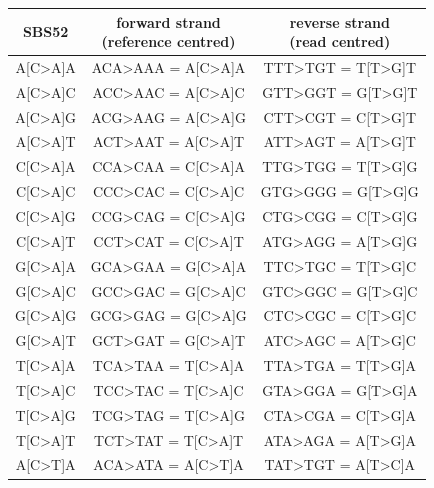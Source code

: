 \begingroup
\setlength{\LTleft}{-20cm plus -1fill} %
\setlength{\LTright}{\LTleft}
\begin{longtable}{c|c|c}
\label{tab:SBS96-to-SBS52} \\ \smallskip
SBS52 & \makecell{forward strand \\ (reference centred)} & \makecell{reverse strand \\ (read centred)}  \\ \hline
\ttfamily A[C>A]A & \ttfamily ACA>AAA = A[C>A]A & \ttfamily TTT>TGT = T[T>G]T \\ \hline
\ttfamily A[C>A]C & \ttfamily ACC>AAC = A[C>A]C & \ttfamily GTT>GGT = G[T>G]T \\ \hline
\ttfamily A[C>A]G & \ttfamily ACG>AAG = A[C>A]G & \ttfamily CTT>CGT = C[T>G]T \\ \hline
\ttfamily A[C>A]T & \ttfamily ACT>AAT = A[C>A]T & \ttfamily ATT>AGT = A[T>G]T \\ \hline
\ttfamily C[C>A]A & \ttfamily CCA>CAA = C[C>A]A & \ttfamily TTG>TGG = T[T>G]G \\ \hline
\ttfamily C[C>A]C & \ttfamily CCC>CAC = C[C>A]C & \ttfamily GTG>GGG = G[T>G]G \\ \hline
\ttfamily C[C>A]G & \ttfamily CCG>CAG = C[C>A]G & \ttfamily CTG>CGG = C[T>G]G \\ \hline
\ttfamily C[C>A]T & \ttfamily CCT>CAT = C[C>A]T & \ttfamily ATG>AGG = A[T>G]G \\ \hline
\ttfamily G[C>A]A & \ttfamily GCA>GAA = G[C>A]A & \ttfamily TTC>TGC = T[T>G]C \\ \hline
\ttfamily G[C>A]C & \ttfamily GCC>GAC = G[C>A]C & \ttfamily GTC>GGC = G[T>G]C \\ \hline
\ttfamily G[C>A]G & \ttfamily GCG>GAG = G[C>A]G & \ttfamily CTC>CGC = C[T>G]C \\ \hline
\ttfamily G[C>A]T & \ttfamily GCT>GAT = G[C>A]T & \ttfamily ATC>AGC = A[T>G]C \\ \hline
\ttfamily T[C>A]A & \ttfamily TCA>TAA = T[C>A]A & \ttfamily TTA>TGA = T[T>G]A \\ \hline
\ttfamily T[C>A]C & \ttfamily TCC>TAC = T[C>A]C & \ttfamily GTA>GGA = G[T>G]A \\ \hline
\ttfamily T[C>A]G & \ttfamily TCG>TAG = T[C>A]G & \ttfamily CTA>CGA = C[T>G]A \\ \hline
\ttfamily T[C>A]T & \ttfamily TCT>TAT = T[C>A]T & \ttfamily ATA>AGA = A[T>G]A \\ \hline
\ttfamily A[C>T]A & \ttfamily ACA>ATA = A[C>T]A & \ttfamily TAT>TGT = A[T>C]A \\ \hline

\end{longtable}
